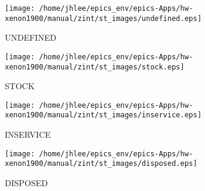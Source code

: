\noindent
\vspace{0.6cm}
\begin{minipage}{.2\textwidth}
\begin{center}
\texttt{[image: /home/jhlee/epics\_env/epics-Apps/hw-xenon1900/manual/zint/st\_images/undefined.eps]}
\end{center}
\end{minipage}
\begin{minipage}{.7\textwidth}
UNDEFINED
\end{minipage}


\noindent
\vspace{0.6cm}
\begin{minipage}{.2\textwidth}
\begin{center}
\texttt{[image: /home/jhlee/epics\_env/epics-Apps/hw-xenon1900/manual/zint/st\_images/stock.eps]}
\end{center}
\end{minipage}
\begin{minipage}{.7\textwidth}
STOCK
\end{minipage}


\noindent
\vspace{0.6cm}
\begin{minipage}{.2\textwidth}
\begin{center}
\texttt{[image: /home/jhlee/epics\_env/epics-Apps/hw-xenon1900/manual/zint/st\_images/inservice.eps]}
\end{center}
\end{minipage}
\begin{minipage}{.7\textwidth}
INSERVICE
\end{minipage}


\noindent
\vspace{0.6cm}
\begin{minipage}{.2\textwidth}
\begin{center}
\texttt{[image: /home/jhlee/epics\_env/epics-Apps/hw-xenon1900/manual/zint/st\_images/disposed.eps]}
\end{center}
\end{minipage}
\begin{minipage}{.7\textwidth}
DISPOSED
\end{minipage}


